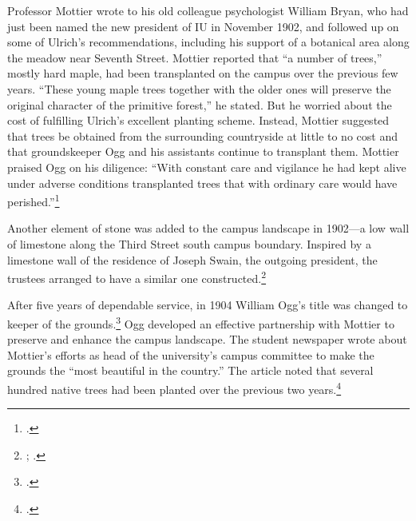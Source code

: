 \documentclass[
  american,
  letterpaper,
]{scrreprt}
\begin{document}
Professor Mottier wrote to his old colleague psychologist William Bryan,
who had just been named the new president of IU in November 1902, and
followed up on some of Ulrich's recommendations, including his support
of a botanical area along the meadow near Seventh Street. Mottier
reported that ``a number of trees,'' mostly hard maple, had been
transplanted on the campus over the previous few years. ``These young
maple trees together with the older ones will preserve the original
character of the primitive forest,'' he stated. But he worried about the
cost of fulfilling Ulrich's excellent planting scheme. Instead, Mottier
suggested that trees be obtained from the surrounding countryside at
little to no cost and that groundskeeper Ogg and his assistants continue
to transplant them. Mottier praised Ogg on his diligence: ``With
constant care and vigilance he had kept alive under adverse conditions
transplanted trees that with ordinary care would have
perished.''\footnote{.}

Another element of stone was added to the campus landscape in 1902---a
low wall of limestone along the Third Street south campus boundary.
Inspired by a limestone wall of the residence of Joseph Swain, the
outgoing president, the trustees arranged to have a similar one
constructed.\footnote{;
  .}

After five years of dependable service, in 1904 William Ogg's title was
changed to keeper of the grounds.\footnote{.}
Ogg developed an effective partnership with Mottier to preserve and
enhance the campus landscape. The student newspaper wrote about
Mottier's efforts as head of the university's campus committee to make
the grounds the ``most beautiful in the country.'' The article noted
that several hundred native trees had been planted over the previous two
years.\footnote{.}
\end{document}
